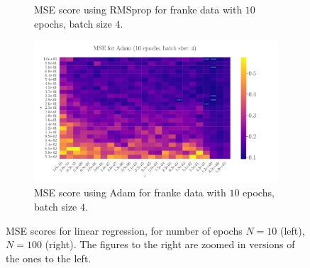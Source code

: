 \documentclass[%
reprint,s
amsmath,amssymb,
aps,
]{revtex4-2}
\begin{document}
\begin{figure}
\begin{subfigure}{0.41\textwidth}
		\caption{MSE score using RMSprop for franke data with \(10\) epochs, batch size \(4\).}
		\label{fig:LinReg25x25_epoch100_bacthS50}
	\end{subfigure}
	\hfill
	\begin{subfigure}{0.41\textwidth}
		\includegraphics[width=\textwidth]{Figures/LinRegAdam_25x25_epoch10_batchS4_zoomed.pdf}
		\caption{MSE score using Adam for franke data with \(10\) epochs, batch size \(4\).}
		\label{fig:LinReg25x25_epoch100_bacthS50_zoomed}
	\end{subfigure}
	\caption{MSE scores for linear regression, for number of epochs \(N=10\) (left), \(N=100\) (right). The figures to the right are zoomed in versions of the ones to the left.}
	\label{fig:LinReg}
\end{figure}

\end{document}
